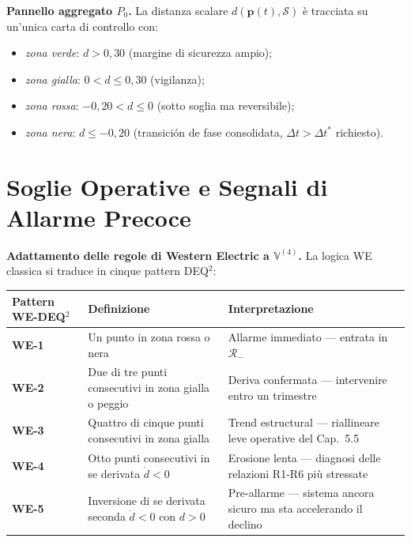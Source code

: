 \Hypoth{} \textbf{Pannello aggregato \(P_0\).} La distanza scalare
\(d(\boldsymbol{p}(t), \mathcal{S})\) è tracciata su un'unica carta di
controllo con:

\begin{itemize}
\tightlist
\item
  \emph{zona verde}: \(d > 0{,}30\) (margine di sicurezza ampio);
\item
  \emph{zona gialla}: \(0 < d \leq 0{,}30\) (vigilanza);
\item
  \emph{zona rossa}: \(-0{,}20 < d \leq 0\) (sotto soglia ma
  reversibile);
\item
  \emph{zona nera}: \(d \leq -0{,}20\) (transición de fase consolidata,
  \(\Delta t > \Delta t^*\) richiesto).
\end{itemize}



\section{Soglie Operative e Segnali di Allarme
Precoce}\label{soglie-operative-e-segnali-di-allarme-precoce}

\Hypoth{} \textbf{Adattamento delle regole di Western Electric a
\(\mathbb{V}^{(4)}\).} La logica WE classica si traduce in cinque
pattern DEQ$^2$:

{\def\LTcaptype{none} %
{\small\begin{longtable}[]{@{}
  >{\raggedright\arraybackslash}p{}
  >{\raggedright\arraybackslash}p{}
  >{\raggedright\arraybackslash}p{}@{}}
\toprule\noalign{}
\begin{minipage}[b]{\linewidth}\raggedright
Pattern WE-DEQ$^2$
\end{minipage} & \begin{minipage}[b]{\linewidth}\raggedright
Definizione
\end{minipage} & \begin{minipage}[b]{\linewidth}\raggedright
Interpretazione
\end{minipage} \\
\midrule\noalign{}
\endhead
\bottomrule\noalign{}
\endlastfoot
\textbf{WE-1} & Un punto in zona rossa o nera & Allarme immediato ---
entrata in \(\mathcal{R}_-\) \\
\textbf{WE-2} & Due di tre punti consecutivi in zona gialla o peggio &
Deriva confermata --- intervenire entro un trimestre \\
\textbf{WE-3} & Quattro di cinque punti consecutivi in zona gialla &
Trend estructural --- riallineare leve operative del Cap.~5.5 \\
\textbf{WE-4} & Otto punti consecutivi in se derivata \(\dot d < 0\) &
Erosione lenta --- diagnosi delle relazioni R1-R6 più stressate \\
\textbf{WE-5} & Inversione di se derivata seconda \(\ddot d < 0\) con
\(d > 0\) & Pre-allarme --- sistema ancora sicuro ma sta accelerando il
declino \\
\end{longtable}}
}


